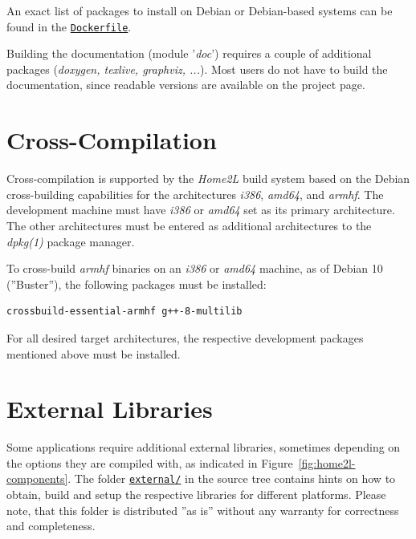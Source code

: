 \documentclass[12pt,english,parskip=half,headheight=19pt]{scrreprt}
\newcommand{\refsrc}[1]{\href{#1}{\texttt{#1}}}     %
\begin{document}
An exact list of packages to install on Debian or Debian-based systems can be found in the \refsrc{Dockerfile}.

Building the documentation (module '\textit{doc}') requires a couple
of additional packages (\textit{doxygen, texlive, graphviz, ...}).
Most users do not have to build the documentation, since readable
versions are available on the project page.





\section{Cross-Compilation}
\label{sec:installing-cross}


Cross-compilation is supported by the \textit{Home2L} build system based on the Debian cross-building capabilities for the architectures \textit{i386}, \textit{amd64}, and \textit{armhf}. The development machine must have \textit{i386} or \textit{amd64} set as its primary architecture. The other architectures must be entered as additional architectures to the \textit{dpkg(1)} package manager.

To cross-build \textit{armhf} binaries on an \textit{i386} or \textit{amd64} machine, as of Debian 10 (''Buster''), the following packages must be installed:
\begin{lstlisting}
crossbuild-essential-armhf g++-8-multilib
\end{lstlisting}

For all desired target architectures, the respective development packages mentioned above must be installed.





\section{External Libraries}
\label{sec:installing-external}


Some applications require additional external libraries, sometimes depending on the options they are compiled with, as indicated in Figure~\ref{fig:home2l-components}. The folder \refsrc{external/} in the source tree contains hints on how to obtain, build and setup the respective libraries for different platforms. Please note, that this folder is distributed ''as is'' without any warranty for correctness and completeness.
\end{document}
